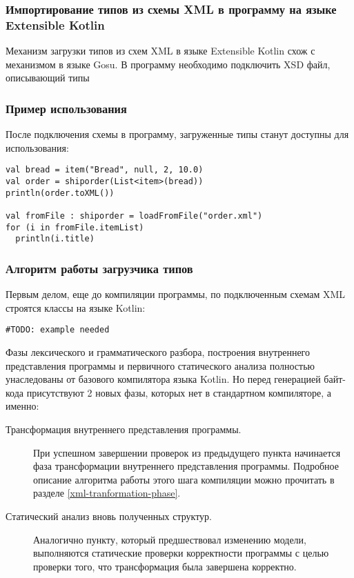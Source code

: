 \subsubsection{Импортирование типов из схемы XML в программу на языке Extensible Kotlin}
Механизм загрузки типов из схем XML в языке Extensible Kotlin схож с механизмом в языке Gosu\td.
В программу необходимо подключить XSD файл, описывающий типы 
\td

\subsubsection{Пример использования}
После подключения схемы в программу, загруженные типы станут доступны для использования: \td

\begin{lstlisting}
val bread = item("Bread", null, 2, 10.0)
val order = shiporder(List<item>(bread))
println(order.toXML())

val fromFile : shiporder = loadFromFile("order.xml")
for (i in fromFile.itemList)
  println(i.title)
\end{lstlisting}

\subsubsection{Алгоритм работы загрузчика типов}

\td Первым делом, еще до компиляции программы, по подключенным схемам XML строятся классы на языке Kotlin:

\begin{lstlisting}
#TODO: example needed
\end{lstlisting}

Фазы лексического и грамматического разбора, построения внутреннего представления программы и первичного статического анализа полностью унаследованы от базового компилятора языка Kotlin. Но перед генерацией байт-кода присутствуют 2 новых фазы, которых нет в стандартном компиляторе, а именно:

\begin{description}
\item[Трансформация внутреннего представления программы.] При успешном завершении проверок из предыдущего пункта начинается фаза трансформации внутреннего представления программы. Подробное описание алгоритма работы этого шага компиляции можно прочитать в разделе \ref{xml-tranformation-phase}.
\item[Статический анализ вновь полученных структур.]
Аналогично пункту, который предшествовал изменению модели, выполняются статические проверки корректности программы с целью проверки того, что трансформация была завершена корректно.
\end{description}

